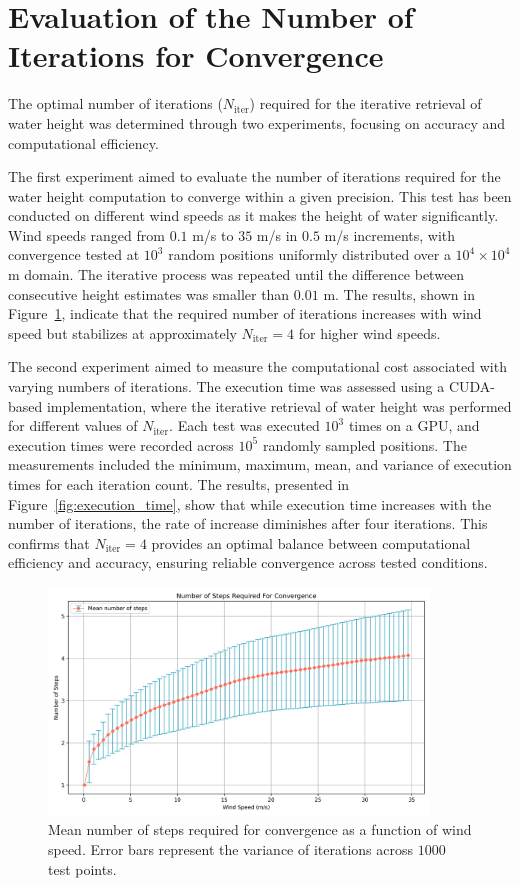 \documentclass[final]{jcgt}
\begin{document}
\section{Evaluation of the Number of Iterations for Convergence}
\label{sec:evaluation_of_the_number_of_iterations_for_convergence}

The optimal number of iterations ($N_{\text{iter}}$) required for the iterative retrieval of water height was determined through two experiments, focusing on accuracy and computational efficiency.

The first experiment aimed to evaluate the number of iterations required for the water height computation to converge within a given precision. This test has been conducted on different wind speeds as it makes the height of water significantly. Wind speeds ranged from $0.1$ m/s to $35$ m/s in $0.5$ m/s increments, with convergence tested at $10^3$ random positions uniformly distributed over a $10^4\times 10^4$ m domain. The iterative process was repeated until the difference between consecutive height estimates was smaller than $0.01$ m. The results, shown in Figure~\ref{fig:convergence_steps}, indicate that the required number of iterations increases with wind speed but stabilizes at approximately $N_{\text{iter}} = 4$ for higher wind speeds. 

The second experiment aimed to measure the computational cost associated with varying numbers of iterations. The execution time was assessed using a CUDA-based implementation, where the iterative retrieval of water height was performed for different values of $N_{\text{iter}}$. Each test was executed $10^3$ times on a GPU, and execution times were recorded across $10^5$ randomly sampled positions. The measurements included the minimum, maximum, mean, and variance of execution times for each iteration count. The results, presented in Figure~\ref{fig:execution_time}, show that while execution time increases with the number of iterations, the rate of increase diminishes after four iterations. This confirms that $N_{\text{iter}} = 4$ provides an optimal balance between computational efficiency and accuracy, ensuring reliable convergence across tested conditions.

\begin{figure}[h!] 
	\centering 
	\includegraphics[width=0.9\textwidth]{Figures/results_cm.png} 
	\caption{Mean number of steps required for convergence as a function of wind speed. Error bars represent the variance of iterations across $1000$ test points.} 
	\label{fig:convergence_steps} 
\end{figure}
\end{document}
